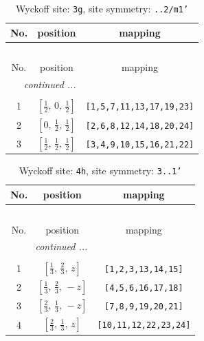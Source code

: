 \documentclass[fleqn,8pt]{jsarticle}
\begin{document}
\begin{longtable}{ccc}
\caption{Wyckoff site: {\tt 3g}, site symmetry: {\tt ..2/m1'}}
 \\
 \hline \hline
No. & position & mapping \\ \hline \endfirsthead

\multicolumn{2}{l}{\tablename\ \thetable{}} \\
 \hline \hline
No. & position & mapping \\ \hline \endhead

 \hline \hline
\multicolumn{2}{r}{\footnotesize\it continued ...} \\ \endfoot

 \hline \hline
\multicolumn{2}{r}{} \\ \endlastfoot

1 & $\left[ \frac{1}{2},\, 0,\, \frac{1}{2} \right]$ & {\tt [1,5,7,11,13,17,19,23]} \\ \hline
2 & $\left[ 0,\, \frac{1}{2},\, \frac{1}{2} \right]$ & {\tt [2,6,8,12,14,18,20,24]} \\ \hline
3 & $\left[ \frac{1}{2},\, \frac{1}{2},\, \frac{1}{2} \right]$ & {\tt [3,4,9,10,15,16,21,22]} \\
\end{longtable}
\renewcommand{\arraystretch}{1.2}
\begin{longtable}{ccc}
\caption{Wyckoff site: {\tt 4h}, site symmetry: {\tt 3..1'}}
 \\
 \hline \hline
No. & position & mapping \\ \hline \endfirsthead

\multicolumn{2}{l}{\tablename\ \thetable{}} \\
 \hline \hline
No. & position & mapping \\ \hline \endhead

 \hline \hline
\multicolumn{2}{r}{\footnotesize\it continued ...} \\ \endfoot

 \hline \hline
\multicolumn{2}{r}{} \\ \endlastfoot

1 & $\left[ \frac{1}{3},\, \frac{2}{3},\, z \right]$ & {\tt [1,2,3,13,14,15]} \\ \hline
2 & $\left[ \frac{1}{3},\, \frac{2}{3},\, - z \right]$ & {\tt [4,5,6,16,17,18]} \\ \hline
3 & $\left[ \frac{2}{3},\, \frac{1}{3},\, - z \right]$ & {\tt [7,8,9,19,20,21]} \\ \hline
4 & $\left[ \frac{2}{3},\, \frac{1}{3},\, z \right]$ & {\tt [10,11,12,22,23,24]} \\
\end{longtable}
\end{document}
